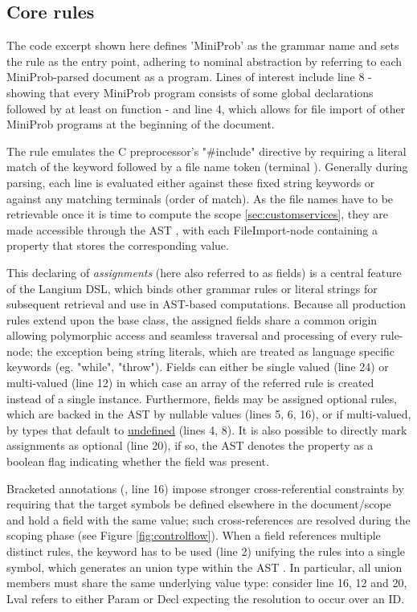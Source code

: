 \subsection*{Core rules}

The code excerpt shown here defines 'MiniProb' as the grammar name and sets the  rule as the entry point, adhering to nominal abstraction by
referring to each MiniProb-parsed document as a program. Lines of interest include line 8 - showing that every MiniProb program consists of some global declarations
followed by at least on function - and line 4, which allows for file import of other MiniProb programs at the beginning of the document.

The  rule emulates the C preprocessor's "\#include" directive by requiring a literal match of the  keyword followed by a
file name token (terminal ). Generally during parsing, each line is evaluated either against these fixed string keywords or against any matching terminals (order of match).
As the file names have to be retrievable once it is time to compute the scope \ref{sec:customservices}, they are made accessible through the AST
, with each FileImport-node containing a  property that stores the corresponding value.

This declaring of \textit{assignments} (here also referred to as fields) is a central feature of the Langium DSL, which binds other grammar rules or literal strings for subsequent retrieval and use in AST-based computations.
Because all production rules extend upon the  base class, the assigned fields share a common origin allowing polymorphic access and seamless traversal and processing of every rule-node;
the exception being string literals, which are treated as language specific keywords (eg. "while", "throw"). Fields can either be single valued (line 24) or multi-valued (line 12)
in which case an array of the referred rule is created instead of a single instance.
Furthermore, fields may be assigned optional rules, which are backed in the AST by nullable values (lines 5, 6, 16), or if multi-valued,
by types that default to \underline{undefined} (lines 4, 8). It is also possible to directly mark assignments as optional (line 20), if so,
the AST denotes the property as a boolean flag indicating whether the field was present.

Bracketed annotations (, line 16) impose stronger cross-referential constraints by requiring
that the target symbols be defined elsewhere in the document/scope and hold a field with the same value; such cross-references are resolved during the scoping phase (see Figure \ref{fig:controlflow}).
When a field references multiple distinct rules, the  keyword has to be used (line 2) unifying the rules into a single symbol, which generates an union type within the AST \cite{typescript-unions-intersections}.
In particular, all union members must share the same underlying value type: consider line 16, 12 and 20, Lval refers to either Param or Decl expecting the resolution to occur
over an ID.

